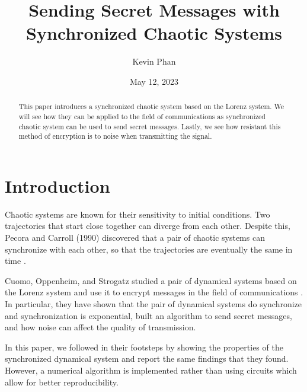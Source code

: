\documentclass[12pt]{article}
\title{Sending Secret Messages with Synchronized Chaotic Systems}
\author{Kevin Phan}
\date{May 12, 2023}
\begin{document}
    \maketitle

    \begin{abstract}
      This paper introduces a synchronized chaotic system based on the Lorenz system. We will see how they can be applied to the field of communications as synchronized chaotic system can be used to send secret messages. Lastly, we see how resistant this method of encryption is to noise when transmitting the signal. 
    \end{abstract}

    \newpage

    \tableofcontents

    \newpage

    \section{Introduction}
    Chaotic systems are known for their sensitivity to initial conditions. Two trajectories that start close together can diverge from each other. Despite this, Pecora and Carroll (1990) discovered that a pair of chaotic systems can synchronize with each other, so that the trajectories are eventually the same in time \cite{pecora}. 

    Cuomo, Oppenheim, and Strogatz studied a pair of dynamical systems based on the Lorenz system and use it to encrypt messages in the field of communications \cite{cuomo1993, expProof, chaoticnoise}. In particular, they have shown that the pair of dynamical systems do synchronize and synchronization is exponential, built an algorithm to send secret messages, and how noise can affect the quality of transmission. 

    In this paper, we followed in their footsteps by showing the properties of the synchronized dynamical system and report the same findings that they found. However, a numerical algorithm is implemented rather than using circuits which allow for better reproducibility. 
\end{document}
